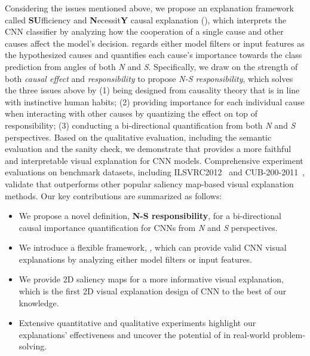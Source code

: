 Considering the issues mentioned above, we propose an explanation framework called \textbf{SU}fficiency and \textbf{N}ecessit\textbf{Y} causal explanation (\name{}), which interprets the CNN classifier by analyzing how the cooperation of a single cause and other causes affect the model's decision.
\name{} regards either model filters or input features as the hypothesized causes and quantifies each cause's importance towards the class prediction from angles of both \textit{N} and \textit{S}.
Specifically, we draw on the strength of both \textit{causal effect} and \textit{responsibility} to propose \textit{N-S responsibility}, which solves the three issues above by (1) being designed from causality theory that is in line with instinctive human habits; (2) providing importance for each individual cause when interacting with other causes by quantizing the effect on top of responsibility; (3) conducting a bi-directional quantification from both \textit{N} and \textit{S} perspectives.
Based on the qualitative evaluation, including the semantic evaluation and the sanity check, we demonstrate that \name{} provides a more faithful and interpretable visual explanation for CNN models.
Comprehensive experiment evaluations on benchmark datasets, including ILSVRC2012~\cite{ILSVRC15} and CUB-200-2011~\cite{welinder2010caltech}, validate that \name{} outperforms other popular saliency map-based visual explanation methods. 
Our key contributions are summarized as follows: 
\begin{itemize}
\setlength{\itemsep}{1pt}
\setlength{\parsep}{1pt}
\setlength{\parskip}{1pt}
\item  We propose a novel definition, \textbf{N-S responsibility}, for a bi-directional causal importance quantification for CNNs from \textit{N} and \textit{S} perspectives.
\item  We introduce a flexible framework, \name{}, which can provide valid CNN visual explanations by analyzing either model filters or input features.
\item We provide 2D saliency maps for a more informative visual explanation, which is the first 2D visual explanation design of CNN to the best of our knowledge.
\item Extensive quantitative and qualitative experiments highlight our explanations' effectiveness and uncover the potential of \name{} in real-world problem-solving.
\end{itemize}
